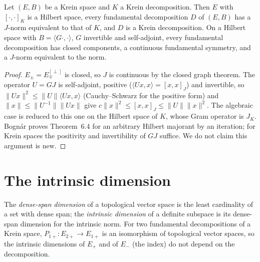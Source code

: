 \begin{theorem}
  \label{thm:kr-majorant}
  \leanok
  Let $(E, B)$ be a Krein space and $K$ a Krein decomposition. Then $E$ with $[\cdot, \cdot]_K$ is
  a Hilbert space, every fundamental decomposition $D$ of $(E, B)$ has a $J$-norm equivalent to
  that of $K$, and $D$ is a Krein decomposition. On a Hilbert space with $B = \langle G \cdot,
  \cdot\rangle$, $G$ invertible and self-adjoint, every fundamental decomposition has closed
  components, a continuous fundamental symmetry, and a $J$-norm equivalent to the norm.
\end{theorem}

\begin{proof}
  \leanok
  $E_\pm = E_\mp^{[\perp]}$ is closed, so $J$ is continuous by the closed graph theorem. The
  operator $U = GJ$ is self-adjoint, positive ($\langle Ux, x\rangle = [x, x]_J$) and invertible,
  so $\|Ux\|^2 \le \|U\|\langle Ux, x\rangle$ (Cauchy--Schwarz for the positive form) and
  $\|x\| \le \|U^{-1}\|\|Ux\|$ give $c\|x\|^2 \le [x, x]_J \le \|U\|\|x\|^2$. The algebraic case
  is reduced to this one on the Hilbert space of $K$, whose Gram operator is $J_K$. Bognár proves
  Theorem~6.4 for an arbitrary Hilbert majorant by an iteration; for Krein spaces the positivity and
  invertibility of $GJ$ suffice. We do not claim this argument is new.
\end{proof}

\section{The intrinsic dimension}

\begin{theorem}
  \label{thm:kr-intrinsic-dim}
  \leanok
  The \emph{dense-span dimension} of a topological vector space is the least cardinality of a set
  with dense span; the \emph{intrinsic dimension} of a definite subspace is its dense-span
  dimension for the intrinsic norm. For two fundamental decompositions of a Krein space,
  $P_{1+} \colon E_{2+} \to E_{1+}$ is an isomorphism of topological vector spaces, so the
  intrinsic dimensions of $E_+$ and of $E_-$ (the index) do not depend on the decomposition.
\end{theorem}

